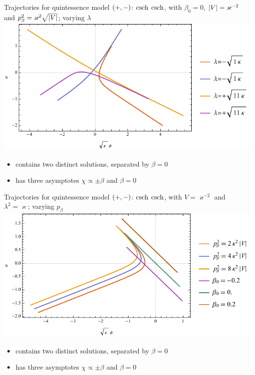 \documentclass[8pt]{beamer}
\begin{document}
\begin{frame}%
{Trajectories for quintessence model ${\left(+,-\right)}$: $\operatorname{csch}$}%
{$\operatorname{csch}$, with $\beta_0 = 0$, ${\left|V\right|} = \varkappa^{-2}$ and
$p_\beta^2 = \varkappa^2\sqrt{{\left|V\right|}}$; varying $\lambda$}
\includegraphics[width=\textwidth]{../plots.nb/csch_lamb_r.pdf}
\begin{itemize}
	\item contains two distinct solutions, separated by $\beta = 0$
	\item has three asymptotes $\chi \propto \pm \beta$ and $\beta = 0$
\end{itemize}
\end{frame}

\begin{frame}%
{Trajectories for quintessence model ${\left(+,-\right)}$: $\operatorname{csch}$}%
{$\operatorname{csch}$, with $V = \varkappa^{-2}$ and
$\lambda^2 = \varkappa$; varying $p_\beta$}
\includegraphics[width=\textwidth]{../plots.nb/csch_pbet_l.pdf}
\begin{itemize}
	\item contains two distinct solutions, separated by $\beta = 0$
	\item has three asymptotes $\chi \propto \pm \beta$ and $\beta = 0$
\end{itemize}
\end{frame}
\end{document}

